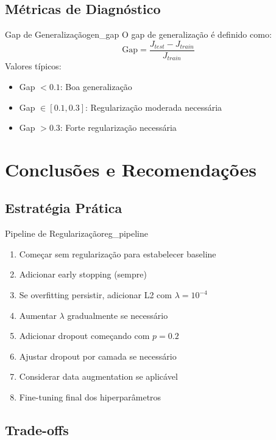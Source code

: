 \documentclass[a4paper,12pt]{article}
\begin{document}
\subsection{Métricas de Diagnóstico}

\begin{definicao}{Gap de Generalização}{gen_gap}
O gap de generalização é definido como:
\[
\text{Gap} = \frac{J_{test} - J_{train}}{J_{train}}
\]
Valores típicos:
\begin{itemize}
    \item Gap $< 0.1$: Boa generalização
    \item Gap $\in [0.1, 0.3]$: Regularização moderada necessária
    \item Gap $> 0.3$: Forte regularização necessária
\end{itemize}
\end{definicao}

\section{Conclusões e Recomendações}

\subsection{Estratégia Prática}

\begin{algoritmo}{Pipeline de Regularização}{reg_pipeline}
\begin{enumerate}
    \item Começar sem regularização para estabelecer baseline
    \item Adicionar early stopping (sempre)
    \item Se overfitting persistir, adicionar L2 com $\lambda = 10^{-4}$
    \item Aumentar $\lambda$ gradualmente se necessário
    \item Adicionar dropout começando com $p = 0.2$
    \item Ajustar dropout por camada se necessário
    \item Considerar data augmentation se aplicável
    \item Fine-tuning final dos hiperparâmetros
\end{enumerate}
\end{algoritmo}

\subsection{Trade-offs}
\end{document}
